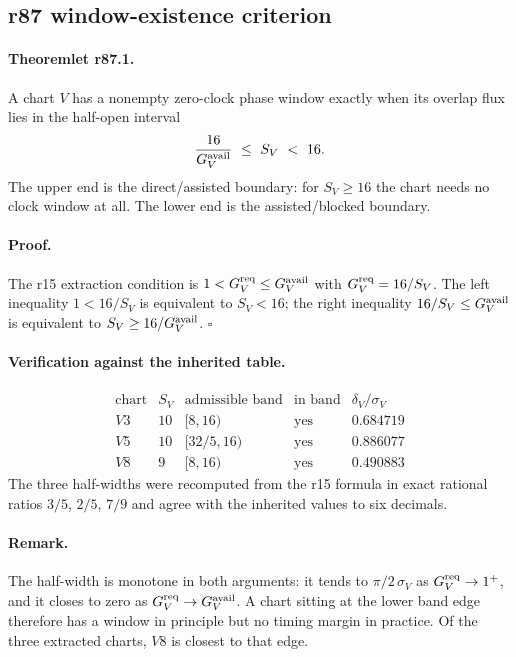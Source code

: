 \subsection*{r87 window-existence criterion}
\label{subsec:r87-window-existence}

\paragraph{Theoremlet r87.1.}
A chart \(V\) has a nonempty zero-clock phase window exactly when its overlap flux lies in
the half-open interval
\[
\frac{16}{G_V^{\rm avail}}\ \le\ S_V\ <\ 16 .
\]
The upper end is the direct/assisted boundary: for \(S_V\ge16\) the chart needs no clock
window at all.  The lower end is the assisted/blocked boundary.

\paragraph{Proof.}
The r15 extraction condition is \(1<G_V^{\rm req}\le G_V^{\rm avail}\) with
\(G_V^{\rm req}=16/S_V\).  The left inequality \(1<16/S_V\) is equivalent to \(S_V<16\); the
right inequality \(16/S_V\le G_V^{\rm avail}\) is equivalent to
\(S_V\ge16/G_V^{\rm avail}\). \(\square\)

\paragraph{Verification against the inherited table.}
\[
\begin{array}{c|c|c|c|c}
\text{chart} & S_V & \text{admissible band} & \text{in band} & \delta_V/\sigma_V\\
\hline
V3 & 10 & [8,16) & \text{yes} & 0.684719\\
V5 & 10 & [32/5,16) & \text{yes} & 0.886077\\
V8 & 9 & [8,16) & \text{yes} & 0.490883
\end{array}
\]
The three half-widths were recomputed from the r15 formula in exact rational ratios
\(3/5\), \(2/5\), \(7/9\) and agree with the inherited values to six decimals.

\paragraph{Remark.}
The half-width is monotone in both arguments: it tends to \(\pi/2\,\sigma_V\) as
\(G_V^{\rm req}\to1^+\), and it closes to zero as \(G_V^{\rm req}\to G_V^{\rm avail}\).  A
chart sitting at the lower band edge therefore has a window in principle but no timing margin
in practice.  Of the three extracted charts, \(V8\) is closest to that edge.

